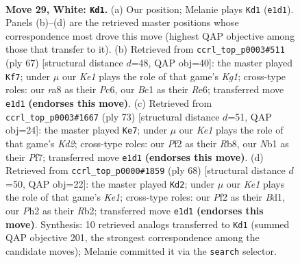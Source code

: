 \documentclass[11pt]{article}
\begin{document}
\clearpage

\begin{figure}[p]\centering
\begin{subfigure}{0.46\textwidth}\centering
\resizebox{\linewidth}{!}{%
\newchessgame
\chessboard[
  setfen={rn6/5k2/5b2/8/p1p1p2p/P7/1PP2PPP/RNB1K3 w - - 0 29},
  showmover=false,
  pgfstyle=straightmove, color=movearrow, markmove={e1-d1}
]}
\caption{}
\end{subfigure}\hfill
\begin{subfigure}{0.46\textwidth}\centering
\resizebox{\linewidth}{!}{%
\newchessgame
\chessboard[
  setfen={6k1/8/2p1r1p1/B1b1ppPp/P6P/5P2/1P2R3/2K5 b - - 0 34},
  showmover=false,
  pgfstyle=straightmove, color=movearrow, markmove={g8-f7}
]}
\caption{}
\end{subfigure}
\\[4pt]
\begin{subfigure}{0.46\textwidth}\centering
\resizebox{\linewidth}{!}{%
\newchessgame
\chessboard[
  setfen={1r6/3k1p2/p2pp2p/P7/1pP1PP2/3R2P1/KP2B2b/8 b - - 10 37},
  showmover=false,
  pgfstyle=straightmove, color=movearrow, markmove={d7-e7}
]}
\caption{}
\end{subfigure}\hfill
\begin{subfigure}{0.46\textwidth}\centering
\resizebox{\linewidth}{!}{%
\newchessgame
\chessboard[
  setfen={2rb1k2/1p6/p3p1p1/P1P1p3/4P2p/2P4P/1R3PP1/3BK3 w - - 3 35},
  showmover=false,
  pgfstyle=straightmove, color=movearrow, markmove={e1-d2}
]}
\caption{}
\end{subfigure}
\caption{\textbf{Move 29, White: \texttt{Kd1}.} (a) Our position; Melanie plays \texttt{Kd1} (\texttt{e1d1}). Panels (b)--(d) are the retrieved master positions whose correspondence most drove this move (highest QAP objective among those that transfer to it). (b) Retrieved from \texttt{ccrl\_top\_p0003\#511} (ply 67) [structural distance $d$=48, QAP obj=40]: the master played \texttt{Kf7}; under $\mu$ our \emph{Ke1} plays the role of that game's \emph{Kg1}; cross-type roles: our \emph{r}a8 as their \emph{P}c6, our \emph{B}c1 as their \emph{R}e6; transferred move \texttt{e1d1} \textbf{(endorses this move)}. (c) Retrieved from \texttt{ccrl\_top\_p0003\#1667} (ply 73) [structural distance $d$=51, QAP obj=24]: the master played \texttt{Ke7}; under $\mu$ our \emph{Ke1} plays the role of that game's \emph{Kd2}; cross-type roles: our \emph{P}f2 as their \emph{R}b8, our \emph{N}b1 as their \emph{P}f7; transferred move \texttt{e1d1} \textbf{(endorses this move)}. (d) Retrieved from \texttt{ccrl\_top\_p0000\#1859} (ply 68) [structural distance $d$=50, QAP obj=22]: the master played \texttt{Kd2}; under $\mu$ our \emph{Ke1} plays the role of that game's \emph{Ke1}; cross-type roles: our \emph{P}f2 as their \emph{B}d1, our \emph{P}h2 as their \emph{R}b2; transferred move \texttt{e1d1} \textbf{(endorses this move)}. Synthesis: 10 retrieved analogs transferred to \texttt{Kd1} (summed QAP objective 201, the strongest correspondence among the candidate moves); Melanie committed it via the \texttt{search} selector.}
\label{fig:thought-m56}
\end{figure}
\end{document}

